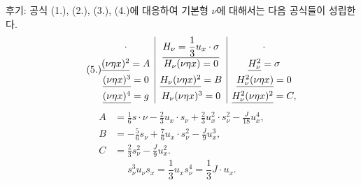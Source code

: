 
후기: 공식 (1.), (2.), (3.), (4.)에 대응하여 기본형 $\nu$에 대해서는 다음 공식들이 성립한다.
\[
\tag{5.}
\begin{array}{@{}c|c|c@{}}
\cdot & \underline{H_\nu=\dfrac13u_x\cdot\sigma} & \cdot\\[0.45em]
\underline{(\nu\eta x)^2}=A & H_\nu(\nu\eta x)=0 & \underline{H_\nu^2}=\sigma\\[0.45em]
\underline{(\nu\eta x)^3}=0 & \underline{H_\nu(\nu\eta x)^2}=B & \underline{H_\nu^2(\nu\eta x)}=0\\[0.45em]
\underline{(\nu\eta x)^4}=g & H_\nu(\nu\eta x)^3=0 & \underline{H_\nu^2(\nu\eta x)^2}=C,
\end{array}
\]
\[
\begin{aligned}
A&=\frac16s\cdot\nu-\frac23u_x\cdot s_\nu+\frac23u_x^2\cdot s_\nu^2-\frac{J}{18}u_x^4,\\
B&=-\frac56s_\nu+\frac76u_x\cdot s_\nu^2-\frac{J}{9}u_x^3,\\
C&=\frac23s_\nu^2-\frac{J}{9}u_x^2.
\end{aligned}
\]
\[
\tag{6.}
s_\nu^3u_\nu s_x=\frac13u_xs_\nu^4=\frac13J\cdot u_x.
\]
